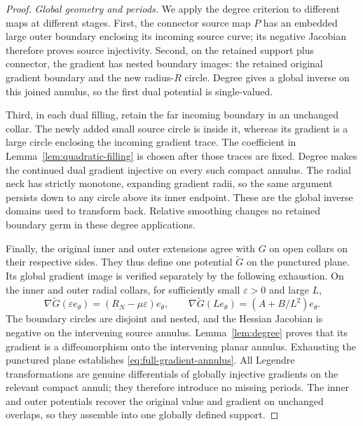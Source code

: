 \documentclass[11pt]{amsart}
\theoremstyle{definition}
\theoremstyle{remark}
\numberwithin{equation}{section}
\begin{document}
\begin{proof}
\emph{Global geometry and periods.}
We apply the degree criterion to different maps at different stages.
First, the connector source map $P$ has an embedded large outer
boundary enclosing its incoming source curve; its negative Jacobian
therefore proves source injectivity. Second, on the retained support
plus connector, the gradient has nested boundary images: the retained
original gradient boundary and the new radius-$R$ circle. Degree gives
a global inverse on this joined annulus, so the first dual potential
is single-valued.

Third, in each dual filling, retain the far incoming boundary in an
unchanged collar. The newly added small source circle is inside it,
whereas its gradient is a large circle enclosing the incoming gradient
trace. The coefficient in Lemma~\ref{lem:quadratic-filling} is chosen
after those traces are fixed. Degree makes the continued dual gradient
injective on every such compact annulus. The radial neck has strictly
monotone, expanding gradient radii, so the same argument persists down
to any circle above its inner endpoint. These are the global inverse
domains used to transform back. Relative smoothing changes no
retained boundary germ in these degree applications.

Finally, the original inner and outer extensions agree with $G$ on
open collars on their respective sides. They thus define one potential
$\widetilde G$ on the punctured plane. Its global gradient image is
verified separately by the following exhaustion. On the inner and outer radial collars,
for sufficiently small $\varepsilon>0$ and large $L$,
\[
 \nabla\widetilde G(\varepsilon e_\theta)
       =(R_N-\mu\varepsilon)e_\theta,
 \qquad
 \nabla\widetilde G(Le_\theta)
       =(A+B/L^2)e_\theta.
\]
The boundary circles are disjoint and nested, and the Hessian
Jacobian is negative on the intervening source annulus.
Lemma~\ref{lem:degree} proves that its gradient is a
diffeomorphism onto the intervening planar annulus. Exhausting the
punctured plane establishes \eqref{eq:full-gradient-annulus}.
All Legendre transformations are genuine differentials of globally
injective gradients on the relevant compact annuli; they therefore
introduce no missing periods. The inner and outer potentials recover
the original value and gradient on unchanged overlaps, so they
assemble into one globally defined support.
\end{proof}
\end{document}

